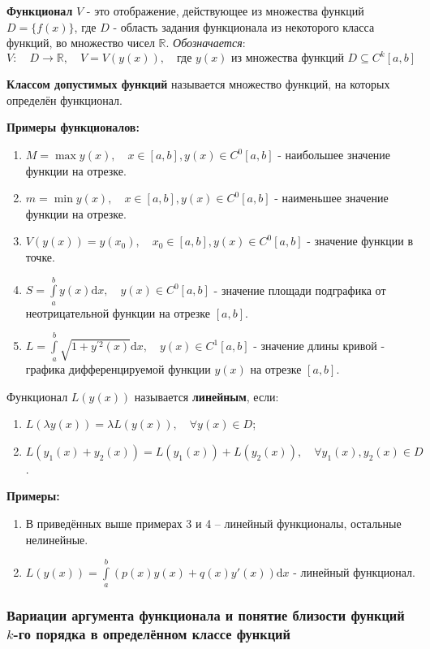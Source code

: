 \documentclass[12pt, a4paper]{article}
\newcommand{\di}{\mathrm{d}}
\begin{document}
\textbf{Функционал} $V$ - это отображение, действующее из множества функций $D = \{ f(x) \}$, где $D$ - область задания функционала из некоторого класса функций, во множество чисел $\mathbb{R}$. \textit{Обозначается}:
\[V: \quad D \to \mathbb{R}, \quad V = V(y(x)), \quad \textrm{где } y(x) \textrm{ из множества функций } D \subseteq C^k[a, b] \]

\textbf{Классом допустимых функций} называется множество функций, на которых определён функционал.

\textbf{Примеры функционалов:}
\begin{enumerate}
 \item $M = \max y(x), \quad x \in [a, b], y(x) \in C^0[a, b]$ - наибольшее значение функции на отрезке.
 \item $m = \min y(x), \quad x \in [a, b], y(x) \in C^0[a, b]$ - наименьшее значение функции на отрезке.
 \item $V(y(x)) = y(x_0), \quad x_0 \in [a, b], y(x) \in C^0[a, b]$ - значение функции в точке.
 \item $S = \int \limits_a^b y(x) \di x, \quad y(x) \in C^0[a, b]$ - значение площади подграфика от неотрицательной функции на отрезке $[a, b]$.
 \item $L = \int \limits_a^b \sqrt{1 + y^{\prime 2}(x)} \di x, \quad y(x) \in C^1[a, b]$ - значение длины кривой - графика дифференцируемой функции $y(x)$ на отрезке $[a, b]$.
\end{enumerate}

Функционал $L(y(x))$ называется \textbf{линейным}, если:
\begin{enumerate}
 \item $L(\lambda y(x)) = \lambda L(y(x)), \quad \forall y(x) \in D$;
 \item $L(y_1(x) + y_2(x)) = L(y_1(x)) + L(y_2(x)), \quad \forall y_1(x), y_2(x) \in D$.
\end{enumerate}

\textbf{Примеры:}
\begin{enumerate}
 \item В приведённых выше примерах 3 и 4 -- линейный функционалы, остальные нелинейные.
 \item $L(y(x)) = \int \limits_a^b (p(x)y(x) + q(x)y'(x)) \di x$ - линейный функционал.
\end{enumerate}

\subsubsection{Вариации аргумента функционала и понятие близости функций $k$-го порядка в определённом классе функций}
\end{document}

